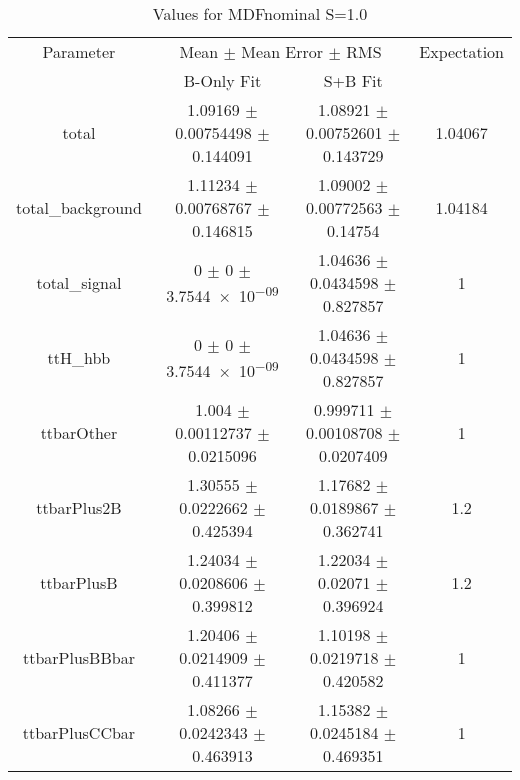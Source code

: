 \begin{table}
\centering
\caption{Values for MDFnominal S=1.0}
\begin{tabular}{cccc}
\toprule
Parameter & \multicolumn{2}{c}{Mean $\pm$ Mean Error $\pm$ RMS} & Expectation\\
 & B-Only Fit & S+B Fit & \\
\midrule
total & \num{1.09169} $\pm$ \num{0.00754498} $\pm$ \num{0.144091} & \num{1.08921} $\pm$ \num{0.00752601} $\pm$ \num{0.143729} & \num{1.04067}\\
total\_background & \num{1.11234} $\pm$ \num{0.00768767} $\pm$ \num{0.146815} & \num{1.09002} $\pm$ \num{0.00772563} $\pm$ \num{0.14754} & \num{1.04184}\\
total\_signal & \num{0} $\pm$ \num{0} $\pm$ \num{3.7544e-09} & \num{1.04636} $\pm$ \num{0.0434598} $\pm$ \num{0.827857} & \num{1}\\
ttH\_hbb & \num{0} $\pm$ \num{0} $\pm$ \num{3.7544e-09} & \num{1.04636} $\pm$ \num{0.0434598} $\pm$ \num{0.827857} & \num{1}\\
ttbarOther & \num{1.004} $\pm$ \num{0.00112737} $\pm$ \num{0.0215096} & \num{0.999711} $\pm$ \num{0.00108708} $\pm$ \num{0.0207409} & \num{1}\\
ttbarPlus2B & \num{1.30555} $\pm$ \num{0.0222662} $\pm$ \num{0.425394} & \num{1.17682} $\pm$ \num{0.0189867} $\pm$ \num{0.362741} & \num{1.2}\\
ttbarPlusB & \num{1.24034} $\pm$ \num{0.0208606} $\pm$ \num{0.399812} & \num{1.22034} $\pm$ \num{0.02071} $\pm$ \num{0.396924} & \num{1.2}\\
ttbarPlusBBbar & \num{1.20406} $\pm$ \num{0.0214909} $\pm$ \num{0.411377} & \num{1.10198} $\pm$ \num{0.0219718} $\pm$ \num{0.420582} & \num{1}\\
ttbarPlusCCbar & \num{1.08266} $\pm$ \num{0.0242343} $\pm$ \num{0.463913} & \num{1.15382} $\pm$ \num{0.0245184} $\pm$ \num{0.469351} & \num{1}\\
\bottomrule
\end{tabular}
\end{table}